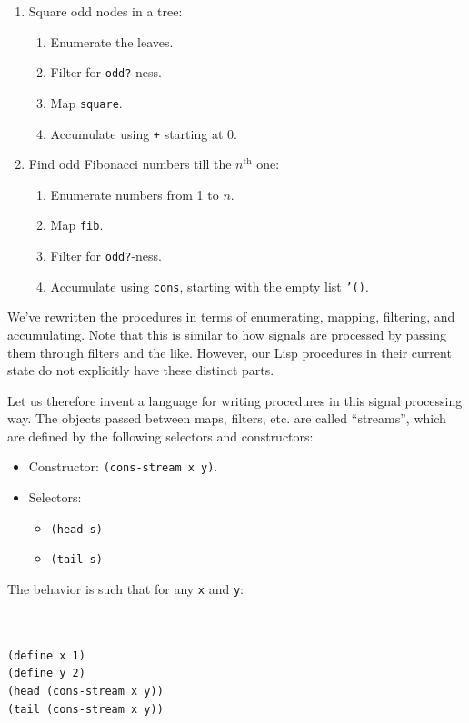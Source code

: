 \documentclass[9pt]{report}
\begin{document}
\begin{enumerate}
\item Square odd nodes in a tree:
\begin{enumerate}
\item Enumerate the leaves.
\item Filter for \texttt{odd?}-ness.
\item Map \texttt{square}.
\item Accumulate using \texttt{+} starting at 0.
\end{enumerate}
\item Find odd Fibonacci numbers till the \(n^{\mathrm{th}}\) one:
\begin{enumerate}
\item Enumerate numbers from 1 to \(n\).
\item Map \texttt{fib}.
\item Filter for \texttt{odd?}-ness.
\item Accumulate using \texttt{cons}, starting with the empty list \texttt{'()}.
\end{enumerate}
\end{enumerate}

We've rewritten the procedures in terms of enumerating, mapping,
filtering, and accumulating. Note that this is similar to how
signals are processed by passing them through filters and the like.
However, our Lisp procedures in their
current state do not explicitly have these distinct parts.

Let us therefore invent a language for writing procedures in this
signal processing way. The objects passed between maps, filters,
etc. are called ``streams'', which are defined by the following
selectors and constructors:
\begin{itemize}
\item Constructor: \texttt{(cons-stream x y)}.
\item Selectors:
\begin{itemize}
\item \texttt{(head s)}
\item \texttt{(tail s)}
\end{itemize}
\end{itemize}

The behavior is such that for any \texttt{x} and \texttt{y}:

\begin{verbatim}


(define x 1)
(define y 2)
(head (cons-stream x y))
(tail (cons-stream x y))
\end{verbatim}
\end{document}
